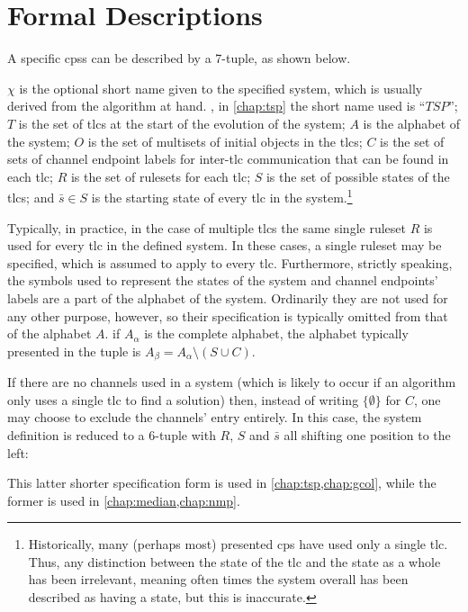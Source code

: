 \section{\label{sec:cps:formaldescriptions}Formal  Descriptions}

A specific \glspl{cps} can be described by a 7-tuple, as shown below.

\cptuplechanstemplate{}

\(\chi\) is the optional short name given to the specified system, which is usually derived from the algorithm at hand.  \Eg{}, in \cref{chap:tsp} the short name used is \enquote{\(\mathit{TSP}\)};  \(T\) is the set of \glspl{tlc} at the start of the evolution of the system; \(A\) is the alphabet of the system; \(O\) is the set of multisets of initial objects in the \glspl{tlc};  \(C\) is the set of sets of channel endpoint labels for inter-\gls{tlc} communication that can be found in each \gls{tlc};  \(R\) is the set of \glspl{ruleset} for each \gls{tlc}; \(S\) is the set of possible states of the \glspl{tlc}; and \(\bar{s} \in S\) is the starting state of every \gls{tlc} in the system.\footnote{Historically, many (perhaps most) presented \gls{cps} have used only a single \gls{tlc}.  Thus, any distinction between the state of the \gls{tlc} and the state as a whole has been irrelevant, meaning often times the system overall has been described as having a state, but this is inaccurate.}

Typically, in practice, in the case of multiple \glspl{tlc} the same single ruleset \(R\) is used for every \gls{tlc} in the defined system.  In these cases, a single ruleset may be specified, which is assumed to apply to every \gls{tlc}.  Furthermore, strictly speaking, the symbols used to represent the states of the system and channel endpoints' labels are a part of the alphabet of the system.  Ordinarily they are not used for any other purpose, however, so their specification is typically omitted from that of the alphabet \(A\).  \Ie{} if \(A_\alpha\) is the complete alphabet, the alphabet typically presented in the tuple is \( A_\beta = A_\alpha \setminus (S \cup C) \).

If there are no channels used in a system (which is likely to occur if an algorithm only uses a single \gls{tlc} to find a solution) then, instead of writing \(\{\emptyset\}\) for \(C\), one may choose to exclude the channels' entry entirely.  In this case, the system definition is reduced to a 6-tuple with \(R\), \(S\) and \(\bar{s}\) all shifting one position to the left:

\cptupletemplate{}

This latter shorter specification form is used in \cref{chap:tsp,chap:gcol}, while the former is used in \cref{chap:median,chap:nmp}.